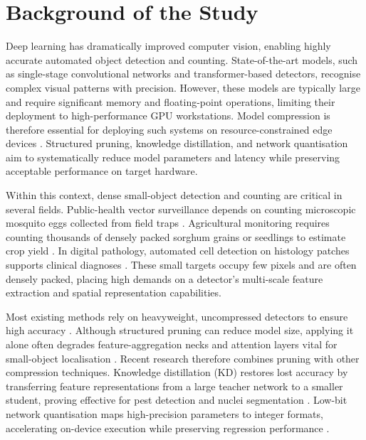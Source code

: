 \section{Background of the Study}
\label{sec:overview}

Deep learning has dramatically improved computer vision, enabling highly accurate automated object detection and counting. State-of-the-art models, such as single-stage convolutional networks and transformer-based detectors, recognise complex visual patterns with precision. However, these models are typically large and require significant memory and floating-point operations, limiting their deployment to high-performance GPU workstations. Model compression is therefore essential for deploying such systems on resource-constrained edge devices \cite{He2025,Wei2018}. Structured pruning, knowledge distillation, and network quantisation aim to systematically reduce model parameters and latency while preserving acceptable performance on target hardware.

Within this context, dense small-object detection and counting are critical in several fields. Public-health vector surveillance depends on counting microscopic mosquito eggs collected from field traps \cite{Javed2023,NaranjoAlcazar2024}. Agricultural monitoring requires counting thousands of densely packed sorghum grains or seedlings to estimate crop yield \cite{Chen2024,Santiago2024}. In digital pathology, automated cell detection on histology patches supports clinical diagnoses \cite{Sali2019,Stoleru2022,Tyagi2023}. These small targets occupy few pixels and are often densely packed, placing high demands on a detector's multi-scale feature extraction and spatial representation capabilities.

\begin{sloppypar}
Most existing methods rely on heavyweight, uncompressed detectors to ensure high accuracy \cite{Bakshi2025,Zhao2023RTDETR}. Although structured pruning can reduce model size, applying it alone often degrades feature-aggregation necks and attention layers vital for small-object localisation \cite{Endrawati2021}. Recent research therefore combines pruning with other compression techniques. Knowledge distillation (KD) restores lost accuracy by transferring feature representations from a large teacher network to a smaller student, proving effective for pest detection \cite{Yu2025_PKD,zhu2023scalekd} and nuclei segmentation \cite{Zhao2026_FKDNuSeg}. Low-bit network quantisation maps high-precision parameters to integer formats, accelerating on-device execution while preserving regression performance \cite{ding2024regptq,xu2023qdetr}.
\end{sloppypar}

